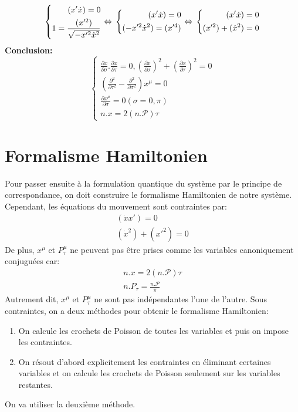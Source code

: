 \documentclass[a4paper,12pt]{article}
\def\xmu{x^\mu}
\def\pt{P_\tau}
\begin{document}
\begin{equation}
	\left\lbrace
	\begin{aligned}
	(x'\dot{x})=0\\
	1=\frac{ (x'^2)}{\sqrt{-x'^2\dot{x}^2}}
	\end{aligned}
	\right.
	\Leftrightarrow\\
	\left\lbrace
	\begin{aligned}
	(x'\dot{x})=0\\
	(-x'^2\dot{x}^2)=(x'^4)
	\end{aligned}
	\right.	
	\Leftrightarrow\\
	\left\lbrace
	\begin{aligned}
	(x'\dot{x})=0\\
	(x'^2)+(\dot{x}^2)=0
	\end{aligned}
	\right.	
\end{equation}
\textbf{Conclusion:}
\begin{equation}
	\left\lbrace
    \begin{aligned}
        \frac{\partial x}{\partial \sigma}.\frac{\partial x}{\partial \tau}=0, \left( \frac{\partial x}{\partial \sigma}\right) ^2+\left( \frac{\partial x}{\partial \tau}\right) ^2=0\\
        \left( \frac{\partial^2}{\partial  \tau^2}-\frac{\partial^2}{\partial  \sigma^2}\right) \xmu=0\\
        \frac{\partial \xmu}{\partial \sigma}=0 	 (\sigma=0,\pi)\\
        n.x=2(n.\mathcal{P})\tau
        \end{aligned}
        \right.
\end{equation}
\section{Formalisme Hamiltonien}
Pour passer ensuite à la formulation quantique du système par le principe de correspondance, on doit construire le formalisme Hamiltonien de notre système. Cependant, les équations du mouvement sont contraintes par:
\begin{align}
(\dot{x}x')=0\\
(\dot{x}^2)+(x'^2)=0
\end{align}
De plus, $\xmu$ et $P_\tau^\mu$ ne peuvent pas être prises comme les variables canoniquement conjuguées car:
\begin{align}
n.x=2(n.\mathcal{P})\tau\\
n.P_\tau=\frac{n.\mathcal{P}}{\pi}
\end{align}
Autrement dit, $\xmu$ et $\pt^\mu$ ne sont pas indépendantes l'une de l'autre. Sous contraintes, on a deux méthodes pour obtenir le formalisme Hamiltonien:
\begin{enumerate}
\item On calcule les crochets de Poisson de toutes les variables et puis on impose les contraintes.
\item On résout d'abord explicitement les contraintes en éliminant certaines variables et on calcule les crochets de Poisson seulement sur les variables restantes.
\end{enumerate} 
On va utiliser la deuxième méthode.
\end{document}
